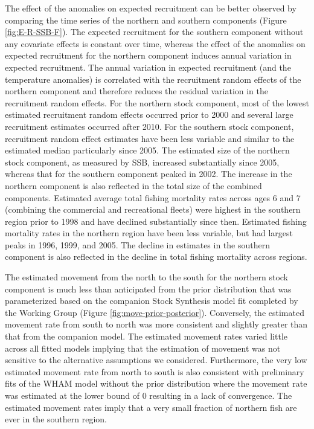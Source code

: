 \documentclass[
]{article}
\begin{document}
The effect of the anomalies on expected recruitment can be better observed by comparing the time series of the northern and southern components (Figure \ref{fig:E-R-SSB-F}). The expected recruitment for the southern component without any covariate effects is constant over time, whereas the effect of the anomalies on expected recruitment for the northern component induces annual variation in expected recruitment. The annual variation in expected recruitment (and the temperature anomalies) is correlated with the recruitment random effects of the northern component and therefore reduces the residual variation in the recruitment random effects. For the northern stock component, most of the lowest estimated recruitment random effects occurred prior to 2000 and several large recruitment estimates occurred after 2010. For the southern stock component, recruitment random effect estimates have been less variable and similar to the estimated median particularly since 2005. The estimated size of the northern stock component, as measured by SSB, increased substantially since 2005, whereas that for the southern component peaked in 2002. The increase in the northern component is also reflected in the total size of the combined components. Estimated average total fishing mortality rates across ages 6 and 7 (combining the commercial and recreational fleets) were highest in the southern region prior to 1998 and have declined substantially since then. Estimated fishing mortality rates in the northern region have been less variable, but had largest peaks in 1996, 1999, and 2005. The decline in estimates in the southern component is also reflected in the decline in total fishing mortality across regions.

The estimated movement from the north to the south for the northern stock component is much less than anticipated from the prior distribution that was parameterized based on the companion Stock Synthesis model fit completed by the Working Group (Figure \ref{fig:move-prior-posterior}). Conversely, the estimated movement rate from south to north was more consistent and slightly greater than that from the companion model. The estimated movement rates varied little across all fitted models implying that the estimation of movement was not sensitive to the alternative assumptions we considered. Furthermore, the very low estimated movement rate from north to south is also consistent with preliminary fits of the WHAM model without the prior distribution where the movement rate was estimated at the lower bound of 0 resulting in a lack of convergence. The estimated movement rates imply that a very small fraction of northern fish are ever in the southern region.
\end{document}
